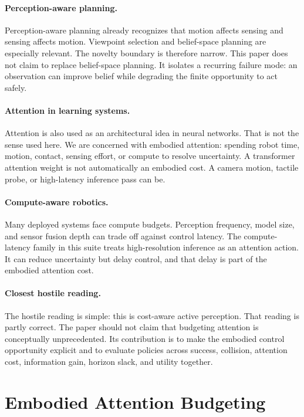 \documentclass{article}
\begin{document}
\paragraph{Perception-aware planning.}
Perception-aware planning already recognizes that motion affects sensing and
sensing affects motion. Viewpoint selection and belief-space planning are
especially relevant. The novelty boundary is therefore narrow. This paper does
not claim to replace belief-space planning. It isolates a recurring failure
mode: an observation can improve belief while degrading the finite opportunity
to act safely.

\paragraph{Attention in learning systems.}
Attention is also used as an architectural idea in neural networks. That is
not the sense used here. We are concerned with embodied attention: spending
robot time, motion, contact, sensing effort, or compute to resolve uncertainty.
A transformer attention weight is not automatically an embodied cost. A camera
motion, tactile probe, or high-latency inference pass can be.

\paragraph{Compute-aware robotics.}
Many deployed systems face compute budgets. Perception frequency, model size,
and sensor fusion depth can trade off against control latency. The
compute-latency family in this suite treats high-resolution inference as an
attention action. It can reduce uncertainty but delay control, and that delay
is part of the embodied attention cost.

\paragraph{Closest hostile reading.}
The hostile reading is simple: this is cost-aware active perception. That
reading is partly correct. The paper should not claim that budgeting attention
is conceptually unprecedented. Its contribution is to make the embodied
control opportunity explicit and to evaluate policies across success,
collision, attention cost, information gain, horizon slack, and utility
together.

\section{Embodied Attention Budgeting}
\end{document}
